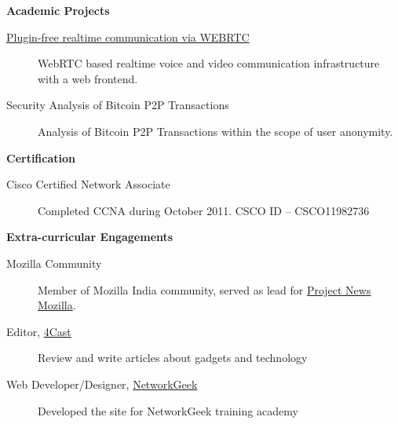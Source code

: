\documentclass[letterpaper,11pt]{article}
\newcommand{\resheading}[1]{{\large \colorbox{mygrey}{\begin{minipage}{\textwidth}{\textbf{#1 \vphantom{p\^{E}}}}\end{minipage}}}}
\begin{document}
\newpage

\resheading{{Academic Projects}}

\begin{description}
\item[\href{http://webrtc-rts.herokuapp.com/}{Plugin-free realtime communication via WEBRTC}] { \footnotesize WebRTC based realtime voice and video communication infrastructure with a web frontend.}

\item[{Security Analysis of Bitcoin P2P Transactions}] { \footnotesize Analysis of Bitcoin P2P Transactions within the scope of user anonymity.}

\end{description}

\resheading{Certification}
\begin{description}

\item[Cisco Certified Network Associate] { \footnotesize Completed CCNA during October 2011. CSCO ID – CSCO11982736}

\end{description}

\resheading{Extra-curricular Engagements} 

	\begin{description}
		\item[Mozilla Community] {\footnotesize Member of Mozilla India community, served as lead for \href{https://wiki.mozilla.org/NeMo}{Project News Mozilla}.}
		\item[Editor, \href{http://www.the4cast.com/author/dwarak}{4Cast}] {\footnotesize Review and write articles about gadgets and technology}
		\item[Web Developer/Designer, \href{http://networkgeek.in/}{NetworkGeek}] {\footnotesize Developed the site for NetworkGeek training academy}
	\end{description}
\end{document}
